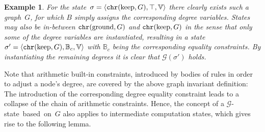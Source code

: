 \documentclass{tlp}
\newtheorem{example}{Example}[section]
\newcommand{\st}[3]{\ensuremath{\langle #1 , #2 , #3 \rangle}}
\newcommand{\mcG}{\ensuremath{\mathcal{G}}}
\newcommand{\bbB}{\ensuremath{\mathbb{B}}}
\newcommand{\bbV}{\ensuremath{\mathbb{V}}}
\DeclareMathOperator{\gnd}{ground}
\DeclareMathOperator{\kp}{keep}
\newcommand{\chr}{\ensuremath{{\tt chr}}}
\begin{document}
\begin{example} 

For the state~$\sigma = \st{\chr(\kp, G)}{\top}{\bbV}$ there clearly exists such
a graph~$G$, for which $B$ simply assigns the corresponding degree variables.
States may also be in-between $\chr(\gnd, G)$ and $\chr(\kp, G)$ in the sense
that only some of the degree variables are instantiated, resulting in a state~$\sigma'
= \st{\chr(\kp,G)}{\bbB_c}{\bbV}$ with $\bbB_c$ being the corresponding equality
constraints. By instantiating the remaining degrees it is clear that
$\mcG(\sigma')$ holds.
\end{example}

Note that arithmetic built-in constraints, introduced by bodies of rules in order
to adjust a node's degree, are covered by the above graph invariant definition:
The introduction of the corresponding degree equality constraint leads to a
collapse of the chain of arithmetic constraints. Hence, the concept of a
\mcG-state~based~on~$G$ also applies to intermediate computation states, which
gives rise to the following lemma.
\end{document}
